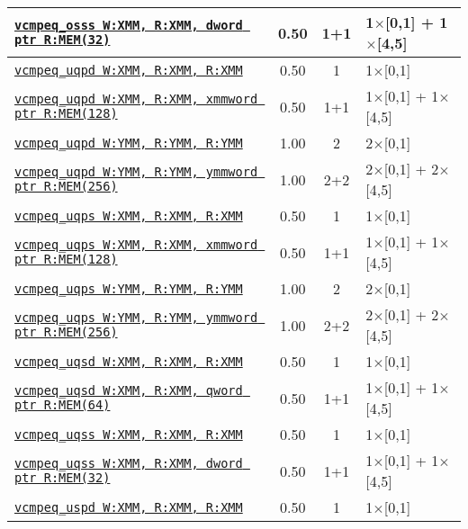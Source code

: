 \documentclass[a4paper,english,fontsize=9]{scrartcl}
\begin{document}
\begin{longtable}{p{}ccL{.25\textwidth}}
  \midrule
  \texttt{\href{https://felixcloutier.com/x86/CMPSS.html}{vcmpeq\_osss W:XMM, R:XMM, dword ptr R:MEM(32)}} & 0.50 & 1+1 & 1\(\times\)[0,1] + 1\(\times\)[4,5] \\
  \midrule
  \texttt{\href{https://felixcloutier.com/x86/CMPPD.html}{vcmpeq\_uqpd W:XMM, R:XMM, R:XMM}} & 0.50 & 1 & 1\(\times\)[0,1] \\
  \midrule
  \texttt{\href{https://felixcloutier.com/x86/CMPPD.html}{vcmpeq\_uqpd W:XMM, R:XMM, xmmword ptr R:MEM(128)}} & 0.50 & 1+1 & 1\(\times\)[0,1] + 1\(\times\)[4,5] \\
  \midrule
  \texttt{\href{https://felixcloutier.com/x86/CMPPD.html}{vcmpeq\_uqpd W:YMM, R:YMM, R:YMM}} & 1.00 & 2 & 2\(\times\)[0,1] \\
  \midrule
  \texttt{\href{https://felixcloutier.com/x86/CMPPD.html}{vcmpeq\_uqpd W:YMM, R:YMM, ymmword ptr R:MEM(256)}} & 1.00 & 2+2 & 2\(\times\)[0,1] + 2\(\times\)[4,5] \\
  \midrule
  \texttt{\href{https://felixcloutier.com/x86/CMPPS.html}{vcmpeq\_uqps W:XMM, R:XMM, R:XMM}} & 0.50 & 1 & 1\(\times\)[0,1] \\
  \midrule
  \texttt{\href{https://felixcloutier.com/x86/CMPPS.html}{vcmpeq\_uqps W:XMM, R:XMM, xmmword ptr R:MEM(128)}} & 0.50 & 1+1 & 1\(\times\)[0,1] + 1\(\times\)[4,5] \\
  \midrule
  \texttt{\href{https://felixcloutier.com/x86/CMPPS.html}{vcmpeq\_uqps W:YMM, R:YMM, R:YMM}} & 1.00 & 2 & 2\(\times\)[0,1] \\
  \midrule
  \texttt{\href{https://felixcloutier.com/x86/CMPPS.html}{vcmpeq\_uqps W:YMM, R:YMM, ymmword ptr R:MEM(256)}} & 1.00 & 2+2 & 2\(\times\)[0,1] + 2\(\times\)[4,5] \\
  \midrule
  \texttt{\href{https://felixcloutier.com/x86/CMPSD.html}{vcmpeq\_uqsd W:XMM, R:XMM, R:XMM}} & 0.50 & 1 & 1\(\times\)[0,1] \\
  \midrule
  \texttt{\href{https://felixcloutier.com/x86/CMPSD.html}{vcmpeq\_uqsd W:XMM, R:XMM, qword ptr R:MEM(64)}} & 0.50 & 1+1 & 1\(\times\)[0,1] + 1\(\times\)[4,5] \\
  \midrule
  \texttt{\href{https://felixcloutier.com/x86/CMPSS.html}{vcmpeq\_uqss W:XMM, R:XMM, R:XMM}} & 0.50 & 1 & 1\(\times\)[0,1] \\
  \midrule
  \texttt{\href{https://felixcloutier.com/x86/CMPSS.html}{vcmpeq\_uqss W:XMM, R:XMM, dword ptr R:MEM(32)}} & 0.50 & 1+1 & 1\(\times\)[0,1] + 1\(\times\)[4,5] \\
  \midrule
  \texttt{\href{https://felixcloutier.com/x86/CMPPD.html}{vcmpeq\_uspd W:XMM, R:XMM, R:XMM}} & 0.50 & 1 & 1\(\times\)[0,1] \\

\end{longtable}
\end{document}
